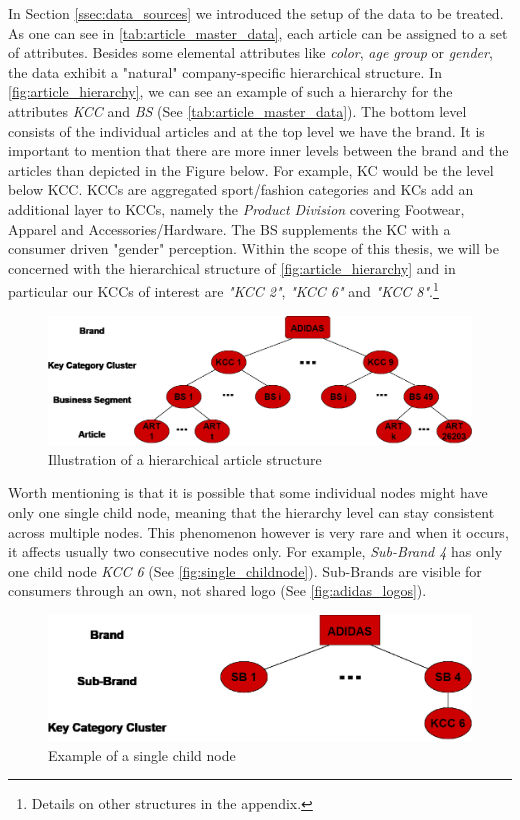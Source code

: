 
In Section \ref{ssec:data_sources} we introduced the setup of the data to be treated. As one can see in \autoref{tab:article_master_data}, each article can be assigned to a set of attributes. Besides some elemental attributes like \textit{color}, \textit{age group} or \textit{gender}, the data exhibit a "natural" company-specific hierarchical structure. In \autoref{fig:article_hierarchy}, we can see an example of such a hierarchy for the attributes \textit{\ac{KCC}} and \textit{\ac{BS}} (See \autoref{tab:article_master_data}). The bottom level consists of the individual articles and at the top level we have the brand. It is important to mention that there are more inner levels between the brand and the articles than depicted in the Figure below. For example, \ac{KC} would be the level below \ac{KCC}. \acp{KCC} are aggregated sport/fashion categories and \acp{KC} add an additional layer to \acp{KCC}, namely the \textit{Product Division} covering Footwear, Apparel and Accessories/Hardware. The \ac{BS} supplements the \ac{KC} with a consumer driven "gender" perception.
Within the scope of this thesis, we will be concerned with the hierarchical structure of \autoref{fig:article_hierarchy} and in particular our \acp{KCC} of interest are \textit{"KCC 2"}, \textit{"KCC 6"} and \textit{"KCC 8"}.\footnote{Details on other structures in the appendix.}\\

\begin{figure}[H]
\centering
  \includegraphics[width=0.95\linewidth]{figures/article_tree_KCC_BS.eps}
  \caption{Illustration of a hierarchical article structure}
  \label{fig:article_hierarchy}
\end{figure}

Worth mentioning is that it is possible that some individual nodes might have only one single child node, meaning that the hierarchy level can stay consistent across multiple nodes. This phenomenon however is very rare and when it occurs, it affects usually two consecutive nodes only. For example, \textit{Sub-Brand 4} has only one child node \textit{KCC 6} (See \autoref{fig:single_childnode}). Sub-Brands are visible for consumers through an own, not shared logo (See \autoref{fig:adidas_logos}).\\

\begin{figure}[H]
\centering
  \includegraphics[width=.7\linewidth]{figures/article_tree_single_childnode.eps}
  \caption{Example of a single child node}
  \label{fig:single_childnode}
\end{figure} 










